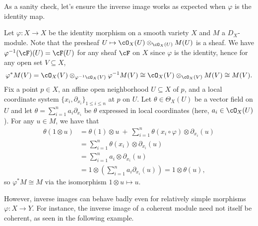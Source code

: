 As a sanity check, let's ensure the inverse image works as expected when $\varphi$ is the identity map.
\begin{example}\label{example:inv-img-sanity-check}
	Let $\varphi:X\to X$ be the identity morphism on a smooth variety $X$ and $M$ a $D_X$-module. Note that the presheaf $U\mapsto \cO_X(U)\otimes_{\cO_X(U)} M(U)$ is a sheaf. We have $\varphi^{-1}(\cF)(U) = \cF(U)$ for any sheaf $\cF$ on $X$ since $\varphi$ is the identity, hence for any open set $V \subseteq X$,
	\begin{align*}
		\varphi^*M(V) = \cO_X(V)\otimes_{\varphi^{-1}\cO_X(V)} \varphi^{-1}M(V) \cong \cO_X(V) \otimes_{\cO_X(V)} M(V) \cong M(V).
	\end{align*}
	Fix a point $p \in X$, an affine open neighborhood $U \subseteq X$ of $p$, and a local coordinate system $\{x_i,\partial_{x_i}\}_{1\leq i\leq n}$ at $p$ on $U$. Let $\theta \in \Theta_X(U)$ be a vector field on $U$ and let $\theta = \sum_{i=1}^n a_i\partial_{x_i}$ be $\theta$ expressed in local coordinates (here, $a_i \in \cO_X(U)$). For any $u \in M$, we have that
	\begin{align*}
		\theta(1\otimes u)
		&= \theta(1)\otimes u ~+~ \sum_{i=1}^n\theta(x_i\circ \varphi)\otimes \partial_{x_i}(u) \\
		&= \sum_{i=1}^n \theta(x_i)\otimes \partial_{x_i}(u) \\
		&= \sum_{i=1}^n a_i\otimes \partial_{x_i}(u) \\
		&= 1 \otimes \left(\sum_{i=1}^n a_i\partial_{x_i}(u)\right) = 1\otimes \theta(u),
	\end{align*}
	so $\varphi^*M \cong M$ via the isomorphism $1\otimes u\mapsto u$.
\end{example}
However, inverse images can behave badly even for relatively simple morphisms $\varphi:X\to Y$. For instance, the inverse image of a coherent module need not itself be coherent, as seen in the following example.
